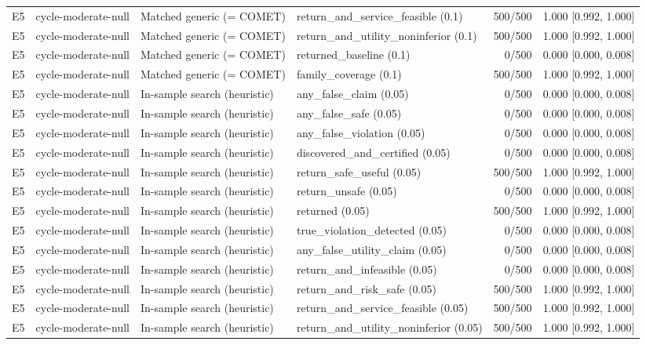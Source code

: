 \begin{longtable}{p{.04\linewidth}p{.18\linewidth}p{.19\linewidth}p{.16\linewidth}r p{.21\linewidth}}
E5 & cycle-moderate-null & Matched generic (= COMET) & return\_and\_service\_feasible (0.1) & 500/500 & 1.000 [0.992, 1.000]\\
E5 & cycle-moderate-null & Matched generic (= COMET) & return\_and\_utility\_noninferior (0.1) & 500/500 & 1.000 [0.992, 1.000]\\
E5 & cycle-moderate-null & Matched generic (= COMET) & returned\_baseline (0.1) & 0/500 & 0.000 [0.000, 0.008]\\
E5 & cycle-moderate-null & Matched generic (= COMET) & family\_coverage (0.1) & 500/500 & 1.000 [0.992, 1.000]\\
E5 & cycle-moderate-null & In-sample search (heuristic) & any\_false\_claim (0.05) & 0/500 & 0.000 [0.000, 0.008]\\
E5 & cycle-moderate-null & In-sample search (heuristic) & any\_false\_safe (0.05) & 0/500 & 0.000 [0.000, 0.008]\\
E5 & cycle-moderate-null & In-sample search (heuristic) & any\_false\_violation (0.05) & 0/500 & 0.000 [0.000, 0.008]\\
E5 & cycle-moderate-null & In-sample search (heuristic) & discovered\_and\_certified (0.05) & 0/500 & 0.000 [0.000, 0.008]\\
E5 & cycle-moderate-null & In-sample search (heuristic) & return\_safe\_useful (0.05) & 500/500 & 1.000 [0.992, 1.000]\\
E5 & cycle-moderate-null & In-sample search (heuristic) & return\_unsafe (0.05) & 0/500 & 0.000 [0.000, 0.008]\\
E5 & cycle-moderate-null & In-sample search (heuristic) & returned (0.05) & 500/500 & 1.000 [0.992, 1.000]\\
E5 & cycle-moderate-null & In-sample search (heuristic) & true\_violation\_detected (0.05) & 0/500 & 0.000 [0.000, 0.008]\\
E5 & cycle-moderate-null & In-sample search (heuristic) & any\_false\_utility\_claim (0.05) & 0/500 & 0.000 [0.000, 0.008]\\
E5 & cycle-moderate-null & In-sample search (heuristic) & return\_and\_infeasible (0.05) & 0/500 & 0.000 [0.000, 0.008]\\
E5 & cycle-moderate-null & In-sample search (heuristic) & return\_and\_risk\_safe (0.05) & 500/500 & 1.000 [0.992, 1.000]\\
E5 & cycle-moderate-null & In-sample search (heuristic) & return\_and\_service\_feasible (0.05) & 500/500 & 1.000 [0.992, 1.000]\\
E5 & cycle-moderate-null & In-sample search (heuristic) & return\_and\_utility\_noninferior (0.05) & 500/500 & 1.000 [0.992, 1.000]\\

\end{longtable}
